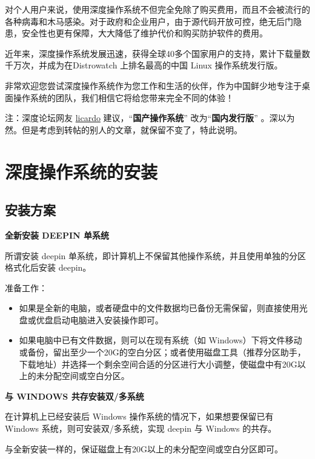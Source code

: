 \documentclass[doctor,openright,twoside]{sjtuthesis}
\providecommand{\tightlist}{%
    \setlength{\itemsep}{0pt}\setlength{\parskip}{0pt}}
\theoremstyle{plain}
\theoremstyle{definition}
\theoremstyle{remark}
\theoremstyle{ocrenumbox}
\theoremstyle{plain}
\begin{document}
对个人用户来说，使用深度操作系统不但完全免除了购买费用，而且不会被流行的各种病毒和木马感染。对于政府和企业用户，由于源代码开放可控，绝无后门隐患，安全性也更有保障，大大降低了维护代价和购买防护软件的费用。

近年来，深度操作系统发展迅速，获得全球40多个国家用户的支持，累计下载量数千万次，并成为在Distrowatch 上排名最高的中国 Linux 操作系统发行版。

非常欢迎您尝试深度操作系统作为您工作和生活的伙伴，作为中国鲜少地专注于桌面操作系统的团队，我们相信它将给您带来完全不同的体验！

注：深度论坛网友 \href{https://bbs.deepin.org/forum.php?mod=viewthread\&tid=145309\&page=1\#pid378170}{licardo} 建议，``\textbf{国产操作系统}'' 改为``\textbf{国内发行版}'' 。深以为然。但是考虑到转帖的别人的文章，就保留不变了，特此说明。

\hypertarget{section-15}{%
\section{深度操作系统的安装}\label{section-15}}

\hypertarget{section-16}{%
\subsection{安装方案}\label{section-16}}

\textbf{全新安装 DEEPIN 单系统}

所谓安装 deepin 单系统，即计算机上不保留其他操作系统，并且使用单独的分区格式化后安装 deepin。

准备工作：

\begin{itemize}
\tightlist
\item
  如果是全新的电脑，或者硬盘中的文件数据均已备份无需保留，则直接使用光盘或优盘启动电脑进入安装操作即可。
\item
  如果电脑中已有文件数据，则可以在现有系统（如 Windows）下将文件移动或备份，留出至少一个20G的空白分区；或者使用磁盘工具（推荐分区助手，下载地址）并选择一个剩余空间合适的分区进行大小调整，使磁盘中有20G以上的未分配空间或空白分区。
\end{itemize}

\textbf{与 WINDOWS 共存安装双/多系统}

在计算机上已经安装后 Windows 操作系统的情况下，如果想要保留已有 Windows 系统，则可安装双/多系统，实现 deepin 与 Windows 的共存。

与全新安装一样的，保证磁盘上有20G以上的未分配空间或空白分区即可。
\end{document}
